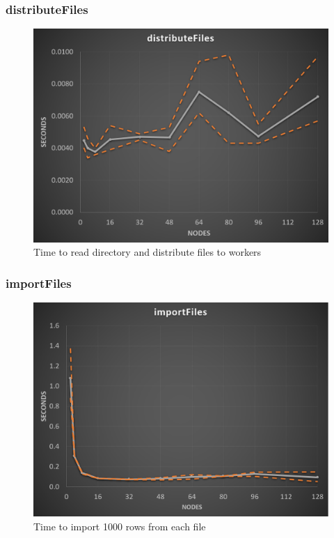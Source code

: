\documentclass{beamer}
\begin{document}
\begin{frame}	
	\frametitle{distributeFiles}
	
	\begin{figure}[!htb]
		\centering
		\vspace{-5pt}
		\includegraphics[scale = 0.30]{distributeFiles.png}
		\vspace{-10pt}
		\caption{Time to read directory and distribute files to workers}
	\end{figure}
	
\end{frame}

\begin{frame}	
	\frametitle{importFiles}
	
	\begin{figure}[!htb]
		\centering
		\vspace{-5pt}
		\includegraphics[scale = 0.30]{importFiles.png}
		\vspace{-10pt}
		\caption{Time to import 1000 rows from each file}
	\end{figure}
	
\end{frame}
\end{document}
